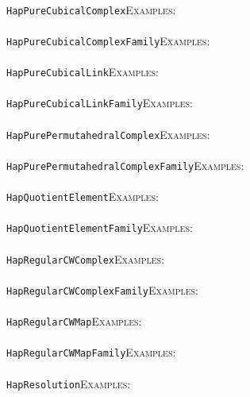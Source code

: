\documentclass[a4paper,11pt]{report}
\begin{document}
{{ \\
 \texttt{HapPureCubicalComplex}{\nobreakspace}{\nobreakspace}{\nobreakspace}{\nobreakspace}\textsc{Examples:} \\
 \\
 \texttt{HapPureCubicalComplexFamily}{\nobreakspace}{\nobreakspace}{\nobreakspace}{\nobreakspace}\textsc{Examples:} \\
 \\
 \texttt{HapPureCubicalLink}{\nobreakspace}{\nobreakspace}{\nobreakspace}{\nobreakspace}\textsc{Examples:} \\
 \\
 \texttt{HapPureCubicalLinkFamily}{\nobreakspace}{\nobreakspace}{\nobreakspace}{\nobreakspace}\textsc{Examples:} \\
 \\
 \texttt{HapPurePermutahedralComplex}{\nobreakspace}{\nobreakspace}{\nobreakspace}{\nobreakspace}\textsc{Examples:} \\
 \\
 \texttt{HapPurePermutahedralComplexFamily}{\nobreakspace}{\nobreakspace}{\nobreakspace}{\nobreakspace}\textsc{Examples:} \\
 \\
 \texttt{HapQuotientElement}{\nobreakspace}{\nobreakspace}{\nobreakspace}{\nobreakspace}\textsc{Examples:} \\
 \\
 \texttt{HapQuotientElementFamily}{\nobreakspace}{\nobreakspace}{\nobreakspace}{\nobreakspace}\textsc{Examples:} \\
 \\
 \texttt{HapRegularCWComplex}{\nobreakspace}{\nobreakspace}{\nobreakspace}{\nobreakspace}\textsc{Examples:} \\
 \\
 \texttt{HapRegularCWComplexFamily}{\nobreakspace}{\nobreakspace}{\nobreakspace}{\nobreakspace}\textsc{Examples:} \\
 \\
 \texttt{HapRegularCWMap}{\nobreakspace}{\nobreakspace}{\nobreakspace}{\nobreakspace}\textsc{Examples:} \\
 \\
 \texttt{HapRegularCWMapFamily}{\nobreakspace}{\nobreakspace}{\nobreakspace}{\nobreakspace}\textsc{Examples:} \\
 \\
 \texttt{HapResolution}{\nobreakspace}{\nobreakspace}{\nobreakspace}{\nobreakspace}\textsc{Examples:} \\
 \\
}}
\end{document}
